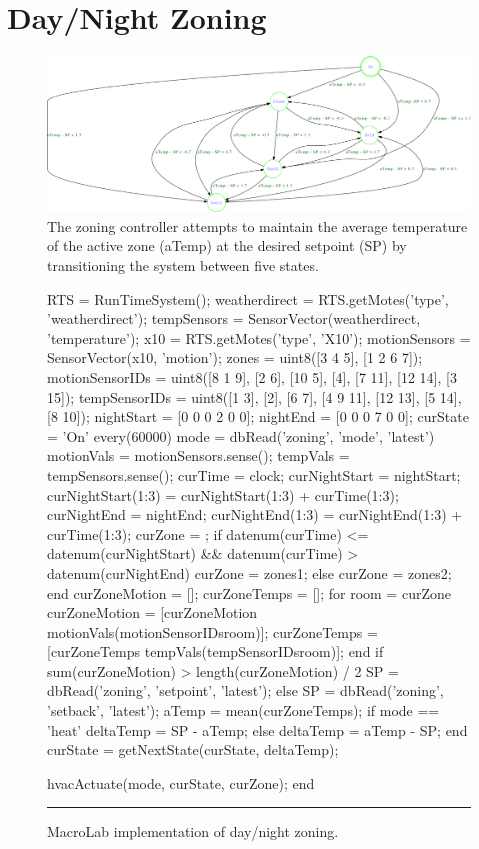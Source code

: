 \chapter{Day/Night Zoning}
\label{appendix:dayNightZoning}


\begin{figure}[ht]
  \centering
  \includegraphics[width=1.0\columnwidth]{fig/fsm.eps}
  \caption[Finite State Machine of Day/Night Zoning Controller]{The
  zoning controller attempts to maintain the average temperature of the active
  zone (aTemp) at the desired setpoint (SP) by transitioning the system between
  five states.}
  \label{fig:stateMachine}
\end{figure}


\begin{figure}
  \begin{macrolab}
RTS = RunTimeSystem();
weatherdirect = RTS.getMotes('type', 'weatherdirect');
tempSensors = SensorVector(weatherdirect, 'temperature');
x10 = RTS.getMotes('type', 'X10');
motionSensors = SensorVector(x10, 'motion');
zones = uint8({[3 4 5], [1 2 6 7]}); %
motionSensorIDs = uint8({[8 1 9], [2 6], [10 5], [4], [7 11], [12 14], [3 15]});
tempSensorIDs = uint8({[1 3], [2], [6 7], [4 9 11], [12 13], [5 14], [8 10]}); 
nightStart = [0 0 0 2 0 0];
nightEnd = [0 0 0 7 0 0];
curState = 'On'
every(60000)
  mode = dbRead('zoning', 'mode', 'latest')
  motionVals = motionSensors.sense();
  tempVals =  tempSensors.sense();
  curTime = clock;
  curNightStart = nightStart;
  curNightStart(1:3) = curNightStart(1:3) + curTime(1:3);
  curNightEnd = nightEnd;
  curNightEnd(1:3) = curNightEnd(1:3) + curTime(1:3);
  curZone = {};
  if datenum(curTime) <= datenum(curNightStart) && datenum(curTime) > datenum(curNightEnd)  
    curZone = zones{1};
  else
    curZone = zones{2};
  end
  curZoneMotion = [];
  curZoneTemps = [];
  for room = curZone
    curZoneMotion = [curZoneMotion motionVals(motionSensorIDs{room})];
    curZoneTemps = [curZoneTemps tempVals(tempSensorIDs{room})];
  end
  if sum(curZoneMotion) > length(curZoneMotion) / 2
    SP = dbRead('zoning', 'setpoint', 'latest');
  else
    SP = dbRead('zoning', 'setback', 'latest');
  aTemp = mean(curZoneTemps);
  if mode == 'heat'
    deltaTemp = SP - aTemp;
  else
    deltaTemp = aTemp - SP;
  end
  curState = getNextState(curState, deltaTemp);

  hvacActuate(mode, curState, curZone);
end
  \end{macrolab}
  \smallskip
  \hrule width 1\columnwidth
  \caption{MacroLab implementation of day/night zoning.}
  \label{code:cs1}
\end{figure}

